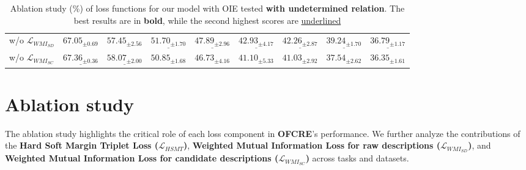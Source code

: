 \begin{table*}[ht]
\begin{adjustbox}{width=\textwidth}
\begin{tabular}{lllllllll}
\quad w/o $\mathcal{L}_{WMI_{SD}}$ & $67.05_{\pm 0.69}$ & $57.45_{\pm 2.56}$ & $\underline{51.70_{\pm 1.70}}$ & $\underline{47.89_{\pm 2.96}}$ & $\underline{42.93_{\pm 4.17}}$  & $\underline{42.26_{\pm 2.87}}$ & $\underline{39.24_{\pm 1.70}}$ & $\underline{36.79_{\pm 1.17}}$\\

\quad w/o $\mathcal{L}_{WMI_{SC}}$ &$\underline{67.36_{\pm 0.36}}$ & $\underline{58.07_{\pm 2.00}}$ & $50.85_{\pm 1.68}$ & $46.73_{\pm 4.16}$ & $41.10_{\pm 5.33}$ & $41.03_{\pm 2.92}$ & {$37.54_{\pm 2.62}$} & {$36.35_{\pm 1.61}$} \\


\bottomrule

\end{tabular}%
\end{adjustbox}
\caption{Ablation study (\%) of loss functions for our model with OIE tested \textbf{with undetermined relation}. The best results are in \textbf{bold}, while the second highest scores are \underline{underlined}}
\label{table:ablation3}
\end{table*}

\section{Ablation study}
The ablation study highlights the critical role of each loss component in \textbf{OFCRE}'s performance. We further analyze the contributions of the \textbf{Hard Soft Margin Triplet Loss ($\mathcal{L}_{HSMT}$)}, \textbf{Weighted Mutual Information Loss for raw descriptions ($\mathcal{L}_{WMI_{SD}}$)}, and \textbf{Weighted Mutual Information Loss for candidate descriptions ($\mathcal{L}_{WMI_{SC}}$)} across tasks and datasets.

